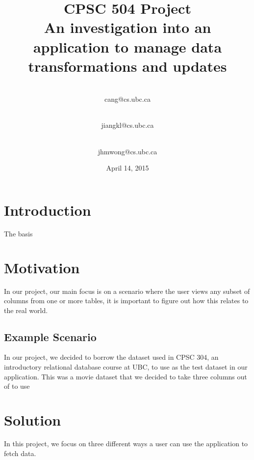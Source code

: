 \documentclass[12pt]{article}
\begin{document}
\begin{titlepage}
\title{\textbf{CPSC 504 Project\\\vspace{3 cm}\Huge{An investigation into an application to manage data transformations and updates}\vspace{2 cm}}}
\date{\vspace{2 cm} April 14, 2015}

\author{
 \\cang@cs.ubc.ca\\
  \and {}\\jiangkl@cs.ubc.ca\\
  \and {}\\jhmwong@cs.ubc.ca\\ 
}
\maketitle
\thispagestyle{empty}
\end{titlepage}

\newpage
\section{Introduction}
The basis 

\section{Motivation}
In our project, our main focus is on a scenario where the user views any subset of columns from one or more tables, it is important to figure out how this relates to the real world.

\subsection{Example Scenario}
In our project, we decided to borrow the dataset used in CPSC 304, an introductory relational database course at UBC, to use as the test dataset in our application. This was a movie dataset that we decided to take three columns out of to use

\section{Solution}
In this project, we focus on three different ways a user can use the application to fetch data.
\end{document}
